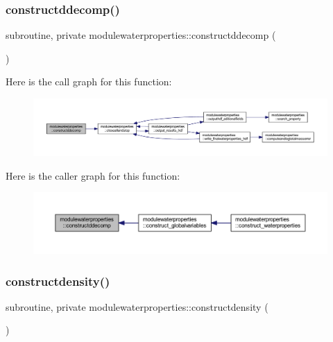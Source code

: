 \subsubsection{\texorpdfstring{constructddecomp()}{constructddecomp()}}
{\footnotesize\ttfamily subroutine, private modulewaterproperties\+::constructddecomp (\begin{DoxyParamCaption}{ }\end{DoxyParamCaption})\hspace{0.3cm}{\ttfamily [private]}}

Here is the call graph for this function\+:\nopagebreak
\begin{figure}[H]
\begin{center}
\leavevmode
\includegraphics[width=350pt]{namespacemodulewaterproperties_aea1140bf6cb4f7e78048a1a4a434435d_cgraph}
\end{center}
\end{figure}
Here is the caller graph for this function\+:\nopagebreak
\begin{figure}[H]
\begin{center}
\leavevmode
\includegraphics[width=350pt]{namespacemodulewaterproperties_aea1140bf6cb4f7e78048a1a4a434435d_icgraph}
\end{center}
\end{figure}
\mbox{\label{namespacemodulewaterproperties_aa61935dbc55b8114ffeef13972cd62b1}} 
\subsubsection{\texorpdfstring{constructdensity()}{constructdensity()}}
{\footnotesize\ttfamily subroutine, private modulewaterproperties\+::constructdensity (\begin{DoxyParamCaption}{ }\end{DoxyParamCaption})\hspace{0.3cm}{\ttfamily [private]}}

